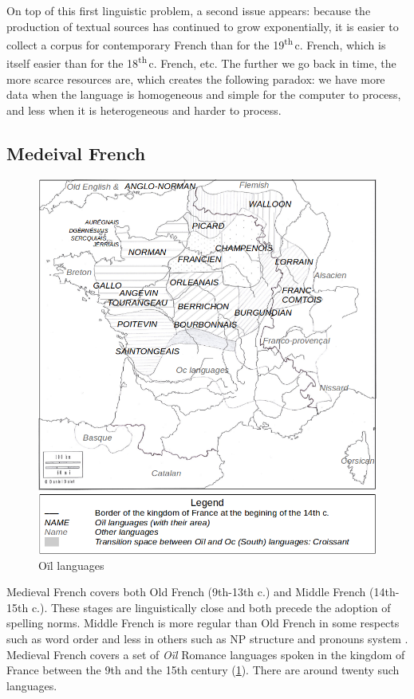 On top of this first linguistic problem, a second issue appears: because the production of textual sources has continued to grow exponentially, it is easier to collect a corpus for contemporary French  than for the 19\textsuperscript{th}\,c. French, which is itself easier than for the 18\textsuperscript{th}\,c. French, etc. The further we go back in time, the more scarce resources are, which creates the following paradox: we have more data when the language is homogeneous and simple for the computer to process, and less when it is heterogeneous and harder to process.

\subsection{Medeival French}

\begin{figure}[thb]
  \centering
  \includegraphics[scale=0.29]{static/media/mod_eval/bertrade/map-dialects2.png}
  \caption{Oïl languages}
  \label{fig:map-dialects}
\end{figure}

Medieval French covers both Old French (9th-13th c.) and Middle French (14th-15th c.). These stages are linguistically close and both precede the adoption of spelling norms. Middle French is more regular than Old French in some respects such as word order \citep{marchello-Nizia-etal-2020-grande} and less in others such as NP structure and pronouns system \citep{marchello-nizia-etal-1979-histoire}. Medieval French covers a set of \textit{Oïl} Romance languages spoken in the kingdom of France between the 9th and the 15th century (\cref{fig:map-dialects}).
There are around twenty such languages.

